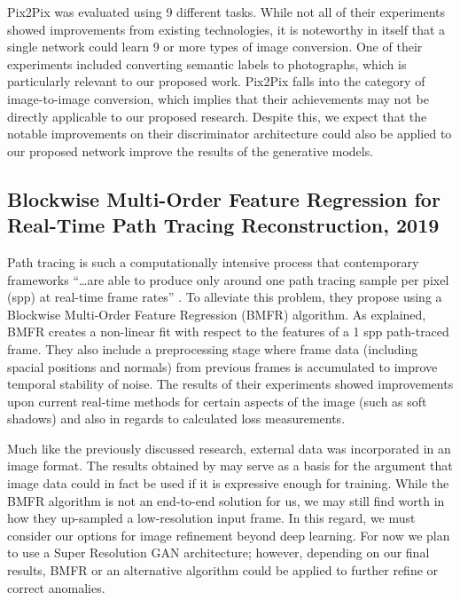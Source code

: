 \documentclass{article}
\begin{document}
Pix2Pix was evaluated using 9 different tasks. While not all of their
experiments showed improvements from existing technologies, it is noteworthy
in itself that a single network could learn 9 or more types of image conversion.
One of their experiments included converting semantic labels to photographs,
which is particularly relevant to our proposed work.
Pix2Pix falls into the category of image-to-image conversion, which implies that
their achievements may not be directly applicable to our proposed research.
Despite this, we expect that the notable improvements on their discriminator 
architecture could also be applied to our proposed network improve the results
of the generative models.

\subsection*{Blockwise Multi-Order Feature Regression for Real-Time Path Tracing Reconstruction, 2019}
\nocite{path_tracing}
Path tracing is such a computationally intensive process that contemporary
frameworks
``\dots are able to produce only around one path tracing sample per pixel (spp)
at real-time frame rates'' \cite{path_tracing}.
To alleviate this problem, they propose using a
Blockwise Multi-Order Feature Regression (BMFR) algorithm.
As explained, BMFR creates a non-linear fit with respect to the
features of a 1 spp path-traced
frame. They also include a preprocessing stage where frame data (including
spacial positions and normals) from previous frames is accumulated to improve
temporal stability of noise. The results of their experiments showed
improvements upon current real-time methods for certain aspects of the image
(such as soft shadows) and also in regards to calculated loss measurements.

Much like the previously discussed research, external data was incorporated
in an image format. The results obtained by \cite{path_tracing}
may serve as a basis
for the argument that image data could in fact be used if it is expressive enough
for training.
While the BMFR algorithm is not an end-to-end solution for us, we may still find
worth in how they up-sampled a low-resolution input frame. In this regard,
we must consider our options for image refinement beyond deep learning.
For now we plan to use a Super Resolution GAN architecture; however, depending on
our final results, BMFR or an alternative algorithm could be
applied to further refine or correct anomalies.
\end{document}

